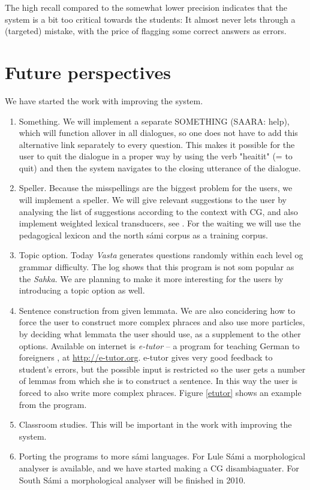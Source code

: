 \documentclass[11pt]{article}
\begin{document}
The high recall compared to the somewhat lower precision indicates that the system is a bit too critical towards the students: It almost never lets through a (targeted) mistake, with the price of flagging some correct answers as errors.
 
\section{Future perspectives}
We have started the work with improving the system.
\begin{enumerate}
\item Something. We will implement a separate SOMETHING (SAARA: help), which will function allover in all dialogues, so one does not have to add this alternative link separately to every question. This makes it possible for the user to quit the dialogue in a proper way by using the verb "heaitit" (= to quit) and then the system navigates to the closing utterance of the dialogue. 
\item Speller. Because the misspellings are the biggest problem for the users, we will implement a speller. We will give relevant suggestions to the user by analysing the list of suggestions according to the context with CG, and also implement weighted lexical transducers, see \cite{Linden:09}. For the waiting we will use the pedagogical lexicon and the north sámi corpus as a training corpus.
\item Topic option. Today \textit{Vasta} generates questions randomly within each level og grammar difficulty. The log shows that this program is not som popular as the \textit{Sahka}. We are planning to make it more interesting for the users by introducing a topic option as well.
\item Sentence construction from given lemmata. We are also concidering how to force the user to construct more complex phraces and also use more particles, by deciding what lemmata the user should use, as a supplement to the other options. Available on internet is \textit{e-tutor} -- a program for teaching German to foreigners \cite{Heift:01,Heift:02}, at \url{http://e-tutor.org}. e-tutor gives very good feedback to student's errors, but the possible input is restricted so the user gets a number of lemmas from which she is to construct a sentence. In this way the user is forced to also write more complex phraces. Figure \ref{etutor} shows an example from the program.
\item Classroom studies. This will be important in the work with improving the system.
\item Porting the programs to more sámi languages. For Lule Sámi a morphological analyser is available, and we have started making a CG disambiaguater. For South Sámi a morphological analyser will be finished in 2010. 
  \end{enumerate} 
\end{document}
